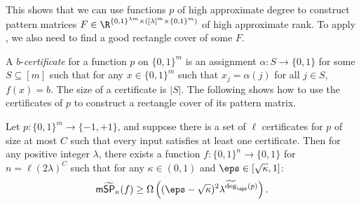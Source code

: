 \documentclass{toc}
\begin{document}
This shows that we can use functions $p$ of high approximate degree to construct pattern matrices $F\in\R^{\{0,1\}^{\lambda m}\times ([\lambda]^m\times\{0,1\}^m)}$ of high approximate rank. To apply , we also need to find a good rectangle cover of some $F$. 

A $b$-\emph{certificate} for a function $p$ on $\{0,1\}^m$ is an assignment $\alpha:S\rightarrow\{0,1\}$ for some $S\subseteq [m]$ such that for any $x\in \{0,1\}^m$ such that $x_j=\alpha(j)$ for all $j\in S$, $f(x)=b$. The size of a certificate is $|S|$. The following shows how to use the certificates of $p$ to construct a rectangle cover of its pattern matrix.


\begin{lemma}\label{lem:certificate}
Let $p:\{0,1\}^m\rightarrow\{-1,+1\}$, and suppose there is a set of $\ell$ certificates for $p$ of size at most $C$ such that every input satisfies at least one certificate. Then for any positive integer $\lambda$, there exists a function $f:\{0,1\}^n\rightarrow\{0,1\}$ for $n=\ell(2\lambda)^C$ such that for any $\kappa\in (0,1)$ and $\eps\in[\sqrt{\kappa},1]$:
$$\mathsf{m}\widetilde{\mathsf{SP}}_{\kappa}(f)\geq \Omega\left( (\eps-\sqrt{\kappa})^2 \lambda^{\widetilde{\deg}_\eps(p)}\right).$$
\end{lemma}
\end{document}
